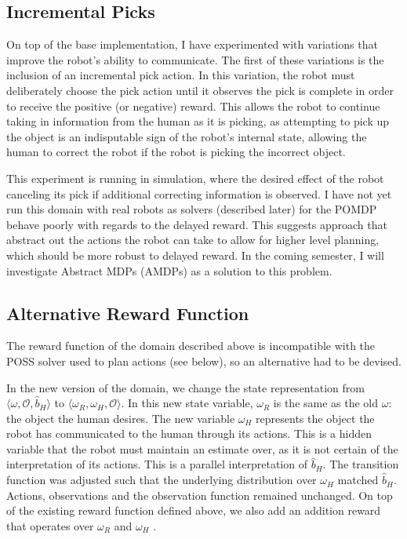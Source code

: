 \documentclass{article}
\begin{document}
\subsection{Incremental Picks}

On top of the base implementation, I have experimented with variations that improve the robot's ability to communicate. The first of these variations is the inclusion of an incremental pick action. In this variation, the robot must deliberately choose the pick action until it observes the pick is complete in order to receive the positive (or negative) reward. This allows the robot to continue taking in information from the human as it is picking, as attempting to pick up the object is an indisputable sign of the robot's internal state, allowing the human to correct the robot if the robot is picking the incorrect object. 

This experiment is running in simulation, where the desired effect of the robot canceling its pick if additional correcting information is observed. I have not yet run this domain with real robots as solvers (described later) for the POMDP behave poorly with regards to the delayed reward. This suggests approach that abstract out the actions the robot can take to allow for higher level planning, which should be more robust to delayed reward. In the coming semester, I will investigate Abstract MDPs (AMDPs) as a solution to this problem. 

\subsection{Alternative Reward Function}

The reward function of the domain described above is incompatible with the POSS solver used to plan actions (see below), so an alternative had to be devised. 

In the new version of the domain, we change the state representation from $\langle \omega, \mathcal{O}, \hat b_H \rangle$ to $\langle \omega_R, \omega_H, \mathcal{O}\rangle$. In this new state variable, $\omega_R$ is the same as the old $\omega$: the object the human desires. The new variable $\omega_H$ represents the object the robot has communicated to the human through its actions. This is a hidden variable that the robot must maintain an estimate over, as it is not certain of the interpretation of its actions. This is a parallel interpretation of $\hat b_H$. The transition function was adjusted such that the underlying distribution over $\omega_H$ matched $\hat b_H$. Actions, observations and the observation function remained unchanged. On top of the existing reward function defined above, we also add an addition reward that operates over $\omega_R$ and $\omega_H$ . 
\end{document}
